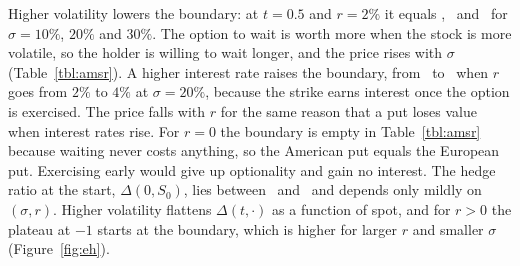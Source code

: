 Higher volatility lowers the boundary: at $t=0.5$ and $r=2\%$ it equals \BhalfLow, \BhalfMid\ and \BhalfHigh\ for $\sigma=10\%$, $20\%$ and $30\%$.
The option to wait is worth more when the stock is more volatile, so the holder is willing to wait longer, and the price rises with $\sigma$ (Table~\ref{tbl:amsr}).
A higher interest rate raises the boundary, from \BhalfMid\ to \BhalfRhigh\ when $r$ goes from $2\%$ to $4\%$ at $\sigma=20\%$, because the strike earns interest once the option is exercised.
The price falls with $r$ for the same reason that a put loses value when interest rates rise.
For $r=0$ the boundary is empty in Table~\ref{tbl:amsr} because waiting never costs anything, so the American put equals the European put.
Exercising early would give up optionality and gain no interest.
The hedge ratio at the start, $\Delta(0,S_0)$, lies between \DeltaRangeLo\ and \DeltaRangeHi\ and depends only mildly on $(\sigma,r)$.
Higher volatility flattens $\Delta(t,\cdot)$ as a function of spot, and for $r>0$ the plateau at $-1$ starts at the boundary, which is higher for larger $r$ and smaller $\sigma$ (Figure~\ref{fig:eh}).
